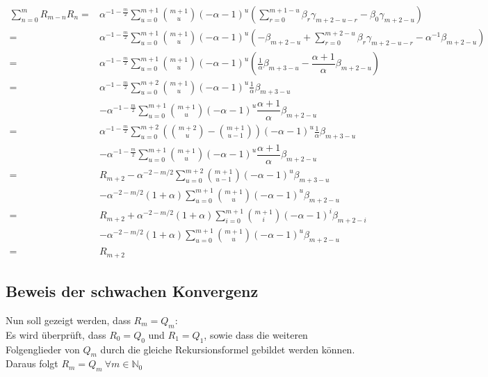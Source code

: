 \documentclass[a4paper, 11pt]{scrreprt}
\newcommand{\NN}{\mathbb{N}}
\begin{document}
\begin{align*}
\sum_{n=0}^m R_{m-n} R_n
=& \alpha^{-1-\frac{m}{2}} \sum_{u=0}^{m+1} \binom{m+1}{u} (-\alpha -1)^u \left( \sum_{r=0}^{m+1-u} \beta_r \gamma_{m+2-u-r} - \beta_0 \gamma_{m+2-u} \right) \\
=& \alpha^{-1-\frac{m}{2}} \sum_{u=0}^{m+1} \binom{m+1}{u} (-\alpha -1)^u \left( - \beta_{m+2-u} + \sum_{r=0}^{m+2-u} \beta_r \gamma_{m+2-u-r} - \alpha^{-1} \beta_{m+2-u}\right) \\
=& \alpha^{-1-\frac{m}{2}} \sum_{u=0}^{m+1} \binom{m+1}{u} (-\alpha -1)^u \left(\frac{1}{\alpha} \beta_{m+3-u} - \dfrac{\alpha +1}{\alpha}\beta_{m+2-u} \right) \\
=& \alpha^{-1-\frac{m}{2}} \sum_{u=0}^{m+2} \binom{m+1}{u} (-\alpha -1)^u \frac{1}{\alpha} \beta_{m+3-u} \\
&- \alpha^{-1-\frac{m}{2}} \sum_{u=0}^{m+1} \binom{m+1}{u} (-\alpha -1)^u \dfrac{\alpha +1}{\alpha}\beta_{m+2-u} \\
=& \alpha^{-1-\frac{m}{2}} \sum_{u=0}^{m+2} \left( \binom{m+2}{u} -\binom{m+1}{u-1} \right) (-\alpha -1)^u \frac{1}{\alpha} \beta_{m+3-u} \\
&- \alpha^{-1-\frac{m}{2}} \sum_{u=0}^{m+1} \binom{m+1}{u} (-\alpha -1)^u \dfrac{\alpha +1}{\alpha}\beta_{m+2-u} \\
=& R_{m+2} - \alpha^{-2-m/2}\sum_{u=0}^{m+2} \binom{m+1}{u-1}(-\alpha-1)^u\beta_{m+3-u} \\
&- \alpha^{-2-m/2}(1+\alpha)\sum_{u=0}^{m+1}\binom{m+1}{u}(-\alpha-1)^u\beta_{m+2-u} \\
=& R_{m+2} + \alpha^{-2-m/2}(1+\alpha)\sum_{i=0}^{m+1} \binom{m+1}{i}(-\alpha-1)^i\beta_{m+2-i} \\
&- \alpha^{-2-m/2}(1+\alpha)\sum_{u=0}^{m+1}\binom{m+1}{u}(-\alpha-1)^u\beta_{m+2-u} \\
=& R_{m+2}
\end{align*}



\subsection*{Beweis der schwachen Konvergenz}


Nun soll gezeigt werden, dass $ R_m=Q_m $:\\
Es wird überprüft, dass $ R_0=Q_0 $ und $ R_1=Q_1 $, sowie dass die weiteren Folgenglieder von $ Q_m $ durch die gleiche Rekursionsformel gebildet werden können. Daraus folgt $ R_m=Q_m ~ \forall m \in \NN_0$ \\
\end{document}
